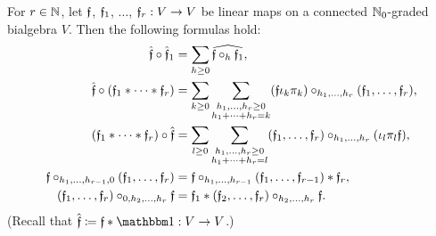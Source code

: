 \documentclass[\MainFolder/Text.tex]{subfiles}
\begin{document}
\begin{Proposition} \label{Prop:PartCompositions}
For $r\in \mathbb{N}$, let $\mathfrak{f}$, $\mathfrak{f}_1$, $\dotsc$, $\mathfrak{f}_r : V \rightarrow V$ be linear maps on a connected $\mathbb{N}_0$-graded bialgebra $V$. Then the following formulas hold:
\begin{align}\label{Eq:FormI}
\hat{\mathfrak{f}} \circ \hat{\mathfrak{f}}_1 &= \sum_{h\ge 0} \widehat{\mathfrak{f}\circ_h \mathfrak{f}_1}, \\ 
   \hat{\mathfrak{f}} \circ (\mathfrak{f}_1 * \dotsb * \mathfrak{f}_r) &= \sum_{k\ge 0}\sum_{\substack{h_1, \dotsc, h_r \ge 0 \\ h_1 + \dotsb + h_r = k}} (\mathfrak{f} \iota_k \pi_k)\circ_{h_1,\dotsc, h_r}(\mathfrak{f}_1,\dotsc, \mathfrak{f}_r), \label{Eq:FormII} \\
   (\mathfrak{f}_1 * \dotsb * \mathfrak{f}_r) \circ \hat{\mathfrak{f}} &= \sum_{l\ge 0} \sum_{\substack{h_1,\dotsc,h_r \ge 0 \\ h_1 + \dotsb + h_r = l}} (\mathfrak{f}_1,\dotsc,\mathfrak{f}_r) \circ_{h_1,\dotsc,h_r} (\iota_l\pi_l\mathfrak{f}),\label{Eq:FormIII} \\
   \mathfrak{f}\circ_{h_1,\dotsc,h_{r-1},0}(\mathfrak{f}_1,\dotsc, \mathfrak{f}_r) &= \mathfrak{f}\circ_{h_1,\dotsc, h_{r-1}}(\mathfrak{f}_1,\dotsc, \mathfrak{f}_{r-1}) * \mathfrak{f}_r, \label{Eq:FormIV} \\ \label{Eq:FormV}
  (\mathfrak{f}_1,\dotsc,\mathfrak{f}_r)\circ_{0,h_2,\dotsc,h_r}\mathfrak{f} &= \mathfrak{f}_1 * (\mathfrak{f}_2,\dotsc,\mathfrak{f}_r)\circ_{h_2,\dotsc,h_r} \mathfrak{f}.
\end{align}
(Recall that $\hat{\MVMorF} \coloneqq \MVMorF\Star \Id: V \rightarrow V$.)
\end{Proposition}
\end{document}

